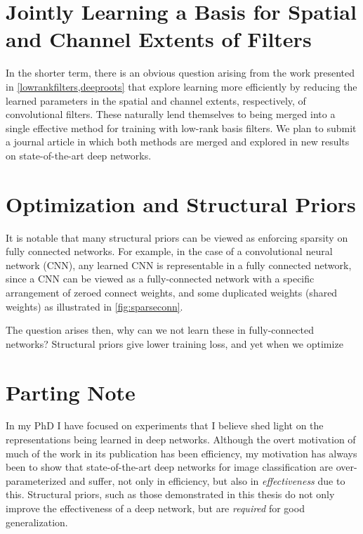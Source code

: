 \documentclass[thesis]{subfiles}
\begin{document}
\section{Jointly Learning a Basis for Spatial and Channel Extents of Filters}
\label{journalplan}
In the shorter term, there is an obvious question arising from the work presented in \cref{lowrankfilters,deeproots} that explore learning more efficiently by reducing the learned parameters in the spatial and channel extents, respectively, of convolutional filters. These naturally lend themselves to being merged into a single effective method for training with low-rank basis filters. We plan to submit a journal article in which both methods are merged and explored in new results on state-of-the-art deep networks.

\section{Optimization and Structural Priors}
It is notable that many structural priors can be viewed as enforcing sparsity on fully connected networks. For example, in the case of a convolutional neural network (CNN), any learned CNN is representable in a fully connected network, since a CNN can be viewed as a fully-connected network with a specific arrangement of zeroed connect weights, and some duplicated weights (shared weights) as illustrated in \cref{fig:sparseconn}.

The question arises then, why can we not learn these in fully-connected networks? Structural priors give lower training loss, and yet when we optimize 
\section{Parting Note}
In my PhD I have focused on experiments that I believe shed light on the representations being learned in deep networks. Although the overt motivation of much of the work in its publication has been efficiency, my motivation has always been to show that state-of-the-art deep networks for image classification are over-parameterized and suffer, not only in efficiency, but also in \emph{effectiveness} due to this. Structural priors, such as those demonstrated in this thesis do not only improve the effectiveness of a deep network, but are \emph{required} for good generalization.
\end{document}
